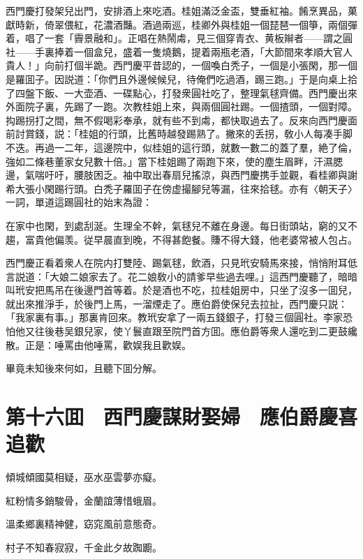 西門慶打發架兒出門，安排酒上來吃酒。桂姐滿泛金盃，雙垂紅袖。餚烹異品，菓獻時新，倚翠偎紅，花濃酒豔。酒過兩巡，桂卿外與桂姐一個琵琶一個箏，兩個彈着，唱了一套「霽景融和」。正唱在熱鬧䖏，見三個穿青衣、黄板辮者——謂之圓社——手裏捧着一個盒兒，盛着一隻燒鵝，提着兩瓶老酒，「大節間來孝順大官人貴人！」向前打個半跪。西門慶平昔認的，一個喚白秃子，一個是小張閑，那一個是羅囬子。因説道：「你們且外邊候候兒，待俺們吃過酒，踢三跑。」于是向桌上拾了四盤下飯、一大壶酒、一碟點心，打發衆圓社吃了，整理氣毬齊備。西門慶出來外面院子裏，先踢了一跑。次教桂姐上來，與兩個圓社踢。一個揸頭，一個對障。抅踢拐打之間，無不假喝彩奉承，就有些不到䖏，都快取過去了。反來向西門慶面前討賞錢，説：「桂姐的行頭，比舊時越發踢熟了。撇來的丢拐，敎小人每凑手脚不迭。再過一二年，這邊院中，似桂姐的這行頭，就數一數二的蓋了羣，絶了倫，強如二條巷董家女兒數十倍。」當下桂姐踢了兩跑下來，使的塵生眉畔，汗濕腮邊，氣喘吁吁，腰肢困乏。袖中取出春扇兒搖涼，與西門慶携手並觀，看桂卿與謝希大張小閑踢行頭。白秃子羅囬子在傍虚撮腳兒等漏，往來拾毬。亦有〈朝天子〉一詞，單道這踢圓社的始末為證：

在家中也閑，到處刮涎。生理全不幹，氣毬兒不離在身邊。每日街頭站，窮的又不趨，富貴他偏羡。従早晨直到晚，不得甚飽餐。賺不得大錢，他老婆常被人包占。

西門慶正看着衆人在院内打雙陸、踢氣毬，飲酒，只見玳安騎馬來接，悄悄附耳低言説道：「大娘二娘家去了。花二娘敎小的請爹早些過去哩。」這西門慶聽了，暗暗叫玳安把馬吊在後邊門首等着。於是酒也不吃，拉桂姐房中，只坐了沒多一囬兒，就出來推淨手，於後門上馬，一溜煙走了。應伯爵使保兒去拉扯，西門慶只説：「我家裏有事。」那裏肯回來。教玳安拿了一兩五錢銀子，打發三個圓社。李家恐怕他又往後巷吴銀兒家，使丫鬟直跟至院門首方囬。應伯爵等衆人還吃到二更鼓纔散。正是：唾罵由他唾罵，歡娱我且歡娱。

畢竟未知後來何如，且聽下囬分解。

\chapter*{第十六囬　西門慶謀財娶婦　應伯爵慶喜追歡}

傾城傾國莫相疑，巫水巫雲夢亦癡。

紅粉情多銷駿骨，金蘭誼薄惜蛾眉。

溫柔鄉裏精神健，窈窕風前意態奇。

村子不知春寂寂，千金此夕故踟躕。

